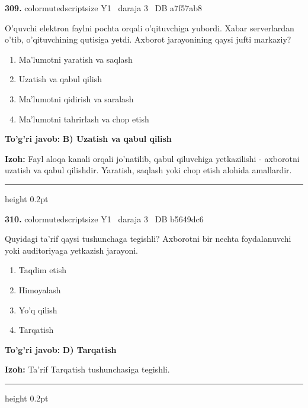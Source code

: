 \documentclass[10pt,a4paper,oneside]{article}
\begin{document}
\noindent\textbf{\color{ink}309.}  {color{muted}scriptsize Y1 \textbullet\ daraja 3 \textbullet\ DB a7f57ab8}
\par
O'quvchi elektron faylni pochta orqali o'qituvchiga yubordi. Xabar serverlardan o'tib, o'qituvchining qutisiga yetdi. Axborot jarayonining qaysi jufti markaziy?
\begin{enumerate}[label=\Alph*),leftmargin=9mm]
\item Ma'lumotni yaratish va saqlash
\item Uzatish va qabul qilish
\item Ma'lumotni qidirish va saralash
\item Ma'lumotni tahrirlash va chop etish
\end{enumerate}
\begin{tcolorbox}[enhanced,breakable,colback=teal!4,colframe=teal!50!black,boxrule=0.5pt,arc=1.1mm,left=3mm,right=3mm,top=1.7mm,bottom=1.7mm,before skip=2mm,after skip=2mm]
\textbf{\color{teal}To'g'ri javob:} \textbf{B) Uzatish va qabul qilish}
\par\smallskip
\textbf{Izoh:} Fayl aloqa kanali orqali jo'natilib, qabul qiluvchiga yetkazilishi - axborotni uzatish va qabul qilishdir. Yaratish, saqlash yoki chop etish alohida amallardir.
\end{tcolorbox}
\vspace{2mm}\hrule height 0.2pt \vspace{3mm}

\noindent\textbf{\color{ink}310.}  {color{muted}scriptsize Y1 \textbullet\ daraja 3 \textbullet\ DB b5649dc6}
\par
Quyidagi ta'rif qaysi tushunchaga tegishli? Axborotni bir nechta foydalanuvchi yoki auditoriyaga yetkazish jarayoni.
\begin{enumerate}[label=\Alph*),leftmargin=9mm]
\item Taqdim etish
\item Himoyalash
\item Yo'q qilish
\item Tarqatish
\end{enumerate}
\begin{tcolorbox}[enhanced,breakable,colback=teal!4,colframe=teal!50!black,boxrule=0.5pt,arc=1.1mm,left=3mm,right=3mm,top=1.7mm,bottom=1.7mm,before skip=2mm,after skip=2mm]
\textbf{\color{teal}To'g'ri javob:} \textbf{D) Tarqatish}
\par\smallskip
\textbf{Izoh:} Ta'rif Tarqatish tushunchasiga tegishli.
\end{tcolorbox}
\vspace{2mm}\hrule height 0.2pt \vspace{3mm}
\end{document}
